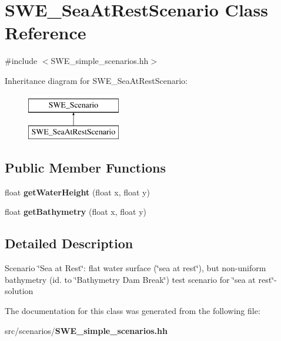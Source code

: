 \section{S\-W\-E\-\_\-\-Sea\-At\-Rest\-Scenario Class Reference}
\label{classSWE__SeaAtRestScenario}


{\ttfamily \#include $<$S\-W\-E\-\_\-simple\-\_\-scenarios.\-hh$>$}

Inheritance diagram for S\-W\-E\-\_\-\-Sea\-At\-Rest\-Scenario\-:\begin{figure}[H]
\begin{center}
\leavevmode
\includegraphics[height=2.000000cm]{classSWE__SeaAtRestScenario}
\end{center}
\end{figure}
\subsection*{Public Member Functions}
\begin{DoxyCompactItemize}
\item 
float {\bfseries get\-Water\-Height} (float x, float y)\label{classSWE__SeaAtRestScenario_a0d493a2c96cde62cc71035c5f62717d1}

\item 
float {\bfseries get\-Bathymetry} (float x, float y)\label{classSWE__SeaAtRestScenario_a738776f758bb5b914ede2e6f57cb3ffd}

\end{DoxyCompactItemize}


\subsection{Detailed Description}
Scenario \char`\"{}\-Sea at Rest\char`\"{}\-: flat water surface (\char`\"{}sea at rest\char`\"{}), but non-\/uniform bathymetry (id. to \char`\"{}\-Bathymetry Dam Break\char`\"{}) test scenario for \char`\"{}sea at rest\char`\"{}-\/solution 

The documentation for this class was generated from the following file\-:\begin{DoxyCompactItemize}
\item 
src/scenarios/{\bf S\-W\-E\-\_\-simple\-\_\-scenarios.\-hh}\end{DoxyCompactItemize}
